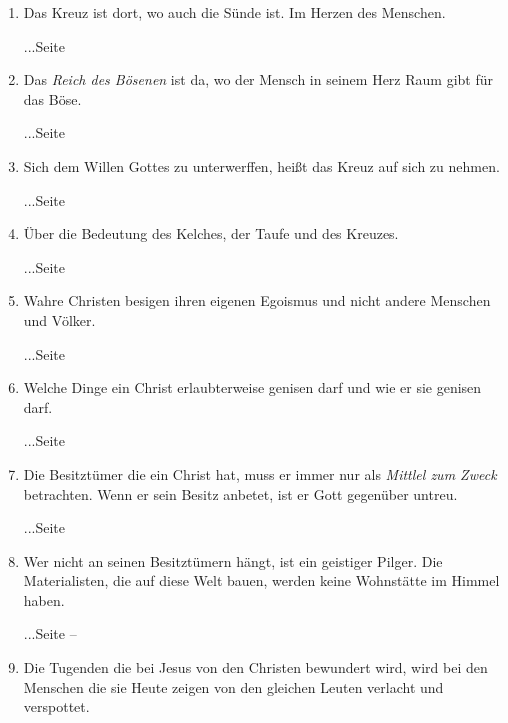 \begin{enumerate}
 \item Das Kreuz ist dort, wo auch die Sünde ist. Im Herzen des Menschen.
 \begin{flushright}...Seite \pageref{ref:03_03_ort_des_kreuzes}\end{flushright}
 \item Das \textit{Reich des Bösenen} ist da, wo der Mensch in seinem Herz Raum gibt für das Böse.
 \begin{flushright}...Seite \pageref{ref:03_04_reich_des_boesen}\end{flushright}
 \item Sich dem Willen Gottes zu unterwerffen, heißt das Kreuz auf sich zu nehmen.
 \begin{flushright}...Seite \pageref{ref:03_05_kreuz_auf_sich_nehmen}\end{flushright}
 \item Über die Bedeutung des Kelches, der Taufe und des Kreuzes.
 \begin{flushright}...Seite \pageref{ref:04_04_kelch_taufe_kreuz}\end{flushright}
 \item Wahre Christen besigen ihren eigenen Egoismus und nicht andere Menschen und Völker.
 \begin{flushright}...Seite \pageref{ref:04_05_besigen}\end{flushright}
 \item Welche Dinge ein Christ erlaubterweise genisen darf und wie er sie genisen darf.
 \begin{flushright}...Seite \pageref{ref:04_07_vorteile}\end{flushright}
 \item Die Besitztümer die ein Christ hat, muss er immer nur als \textit{Mittlel zum Zweck} betrachten. Wenn er sein Besitz anbetet, ist er Gott gegenüber untreu.
 \begin{flushright}...Seite \pageref{ref:04_07_vorteile}\end{flushright}
 \item Wer nicht an seinen Besitztümern hängt, ist ein geistiger Pilger. Die Materialisten, die auf diese Welt bauen, werden keine Wohnstätte im Himmel haben.
 \begin{flushright}...Seite \pageref{ref:04_10_pilger} -- \pageref{ref:04_10_pilger_ende}\end{flushright}
 \item Die Tugenden die bei Jesus von den Christen bewundert wird, wird bei den Menschen die sie Heute zeigen von den gleichen Leuten verlacht und verspottet.

\end{enumerate}
